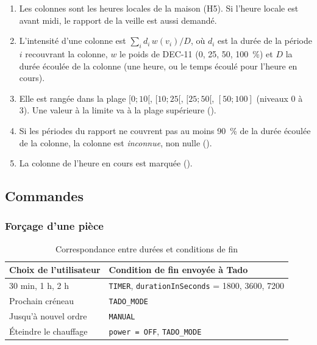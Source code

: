 \begin{enumerate}
  \item Les colonnes sont les heures locales de la maison (H5). Si l'heure locale est avant
        midi, le rapport de la veille est aussi demandé.
  \item L'intensité d'une colonne est $\sum_i d_i\,w(v_i) / D$, où $d_i$ est la durée de la période $i$
        recouvrant la colonne, $w$ le poids de DEC-11 (0, 25, 50, 100~\%) et $D$ la durée écoulée de
        la colonne (une heure, ou le temps écoulé pour l'heure en cours).
  \item Elle est rangée dans la plage $[0;10[$, $[10;25[$, $[25;50[$, $[50;100]$ (niveaux 0 à 3). Une valeur à
        la limite va à la plage supérieure ().
  \item Si les périodes du rapport ne couvrent pas au moins 90~\% de la durée écoulée de la
        colonne, la colonne est \emph{inconnue}, non nulle ().
  \item La colonne de l'heure en cours est marquée ().
\end{enumerate}

\subsection{Commandes}

\subsubsection{Forçage d'une pièce}

\begin{table}[H]
  \centering\small
  \begin{tabular}{@{}ll@{}}
    \toprule
    \textbf{Choix de l'utilisateur} & \textbf{Condition de fin envoyée à Tado} \\
    \midrule
    30 min, 1 h, 2 h & \texttt{TIMER}, \texttt{durationInSeconds} = 1800, 3600, 7200 \\
    Prochain créneau & \texttt{TADO\_MODE} \\
    Jusqu'à nouvel ordre & \texttt{MANUAL} \\
    Éteindre le chauffage & \texttt{power = OFF}, \texttt{TADO\_MODE} \\
    \bottomrule
  \end{tabular}
  \caption{Correspondance entre durées et conditions de fin}
\end{table}

